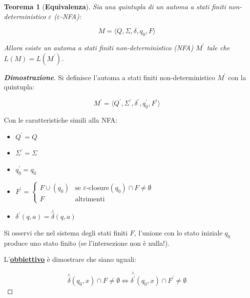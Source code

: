 \documentclass[a4paper]{article}
\newtheorem{theorem}{Teorema}
\begin{document}
	\begin{theorem}[\textbf{Equivalenza}]
		Sia una quintupla di un automa a stati finiti non-deterministico $\varepsilon$ ($\varepsilon$-NFA):
		
		\begin{equation*}
			M = \langle Q, \Sigma, \delta, q_{0}, F \rangle
		\end{equation*}
	
		\noindent
		Allora esiste un automa a stati finiti non-deterministico (NFA) $M^{'}$ tale che $L\left(M\right) = L\left(M^{'}\right)$.
	\end{theorem}

	\begin{proof}[\textbf{Dimostrazione}]
		Si definisce l'automa a stati finiti non-deterministico $M^{'}$ con la quintupla:
		
		\begin{equation*}
			M^{'} = \langle Q^{'}, \Sigma^{'}, \delta^{'}, q_{0}^{'}, F^{'} \rangle
		\end{equation*}
	
		\noindent
		Con le caratteristiche simili alla NFA:
		
		\begin{itemize}
			\item $Q^{'} = Q$
			\item $\Sigma^{'} = \Sigma$
			\item $q_{0}^{'} = q_{0}$
			\item $F^{'} =
				\begin{cases}
					F \cup \left(q_{0}\right) 	& \text{se } \varepsilon\text{-closure}\left(q_{0}\right) \cap F \ne \emptyset \\
					F 							& \text{altrimenti}
				\end{cases}$
			\item $\delta^{'} \left(q,a\right) = \overset{\wedge}{\delta}\left(q,a\right)$
		\end{itemize}
	
		\noindent
		Si osservi che nel sistema degli stati finiti $F$, l'unione con lo stato iniziale $q_{0}$ produce uno stato finito (se l'intersezione non è nulla!).
		
		\noindent
		L'\textbf{\underline{obbiettivo}} è dimostrare che siano uguali:
		
		\begin{equation*}
			\overset{\wedge}{\delta}\left(q_{0}, x\right) \cap F \ne \emptyset \iff \overset{\wedge}{\delta^{'}}\left(q_{0}, x\right) \cap F^{'} \ne \emptyset
		\end{equation*}
		

\end{proof}
\end{document}
